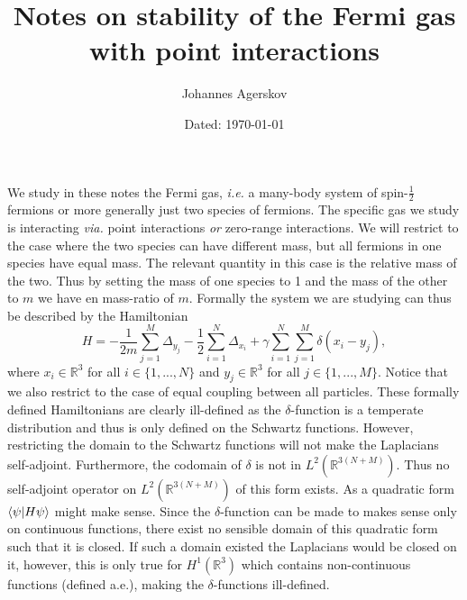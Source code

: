 \documentclass[a4paper,11pt]{article}
\author{Johannes Agerskov}
\date{Dated: \today}
\title{Notes on stability of the Fermi gas with point interactions}
\newcommand{\ie}{\emph{i.e.} }
\newcommand{\R}{\mathbb{R}}
\numberwithin{equation}{section}
\begin{document}
	\maketitle
	\tableofcontents
\vspace{1cm}
We study in these notes the Fermi gas, \ie a many-body system of spin-$ \frac{1}{2} $ fermions or more generally just two species of fermions. The specific gas we study is interacting \emph{via.} point interactions \emph{or} zero-range interactions. We will restrict to the case where the two species can have different mass, but all fermions in one species have equal mass. The relevant quantity in this case is the relative mass of the two. Thus by setting the mass of one species to 1 and the mass of the other to $ m $ we have en mass-ratio of $ m $. Formally the system we are studying can thus be described by the Hamiltonian \begin{equation}\label{Formal Hamiltonian}
H=-\frac{1}{2m}\sum_{j=1}^{M}\Delta_{y_j}-\frac{1}{2}\sum_{i=1}^{N}\Delta_{x_i}+\gamma\sum_{i=1}^{N}\sum_{j=1}^{M}\delta(x_i-y_j),
\end{equation}
where $ x_i\in\mathbb{R}^3 $ for all $ i\in\{1,...,N\} $ and $ y_j\in\mathbb{R}^3 $ for all $ j\in\{1,...,M\} $. Notice that we also restrict to the case of equal coupling between all particles. These formally defined Hamiltonians are clearly ill-defined as the $ \delta $-function is a  temperate distribution and thus is only defined on the Schwartz functions. However, restricting the domain to the Schwartz functions will not make the Laplacians self-adjoint. Furthermore, the codomain of $ \delta $ is not in $ L^2(\mathbb{R}^{3(N+M)}) $. Thus no self-adjoint operator on $ L^2(\R^{3(N+M)}) $ of this form exists.
As a quadratic form $ \braket{\psi|H\psi} $ might make sense. Since the $ \delta $-function can be made to makes sense only on continuous functions, there exist no sensible domain of this quadratic form such that it is closed. If such a domain existed the Laplacians would be closed on it, however, this is only true for $ H^1(\mathbb{R}^3) $ which contains non-continuous functions (defined a.e.), making the $ \delta $-functions ill-defined.
\end{document}
